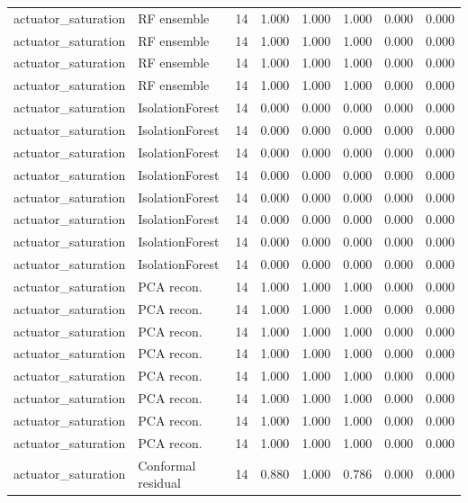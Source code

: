 {\begin{longtable}{llrrrrrr}
actuator\_saturation & RF ensemble & 14 & 1.000 & 1.000 & 1.000 & 0.000 & 0.000 \\
actuator\_saturation & RF ensemble & 14 & 1.000 & 1.000 & 1.000 & 0.000 & 0.000 \\
actuator\_saturation & RF ensemble & 14 & 1.000 & 1.000 & 1.000 & 0.000 & 0.000 \\
actuator\_saturation & RF ensemble & 14 & 1.000 & 1.000 & 1.000 & 0.000 & 0.000 \\
actuator\_saturation & IsolationForest & 14 & 0.000 & 0.000 & 0.000 & 0.000 & 0.000 \\
actuator\_saturation & IsolationForest & 14 & 0.000 & 0.000 & 0.000 & 0.000 & 0.000 \\
actuator\_saturation & IsolationForest & 14 & 0.000 & 0.000 & 0.000 & 0.000 & 0.000 \\
actuator\_saturation & IsolationForest & 14 & 0.000 & 0.000 & 0.000 & 0.000 & 0.000 \\
actuator\_saturation & IsolationForest & 14 & 0.000 & 0.000 & 0.000 & 0.000 & 0.000 \\
actuator\_saturation & IsolationForest & 14 & 0.000 & 0.000 & 0.000 & 0.000 & 0.000 \\
actuator\_saturation & IsolationForest & 14 & 0.000 & 0.000 & 0.000 & 0.000 & 0.000 \\
actuator\_saturation & IsolationForest & 14 & 0.000 & 0.000 & 0.000 & 0.000 & 0.000 \\
actuator\_saturation & PCA recon. & 14 & 1.000 & 1.000 & 1.000 & 0.000 & 0.000 \\
actuator\_saturation & PCA recon. & 14 & 1.000 & 1.000 & 1.000 & 0.000 & 0.000 \\
actuator\_saturation & PCA recon. & 14 & 1.000 & 1.000 & 1.000 & 0.000 & 0.000 \\
actuator\_saturation & PCA recon. & 14 & 1.000 & 1.000 & 1.000 & 0.000 & 0.000 \\
actuator\_saturation & PCA recon. & 14 & 1.000 & 1.000 & 1.000 & 0.000 & 0.000 \\
actuator\_saturation & PCA recon. & 14 & 1.000 & 1.000 & 1.000 & 0.000 & 0.000 \\
actuator\_saturation & PCA recon. & 14 & 1.000 & 1.000 & 1.000 & 0.000 & 0.000 \\
actuator\_saturation & PCA recon. & 14 & 1.000 & 1.000 & 1.000 & 0.000 & 0.000 \\
actuator\_saturation & Conformal residual & 14 & 0.880 & 1.000 & 0.786 & 0.000 & 0.000 \\

\end{longtable}}
